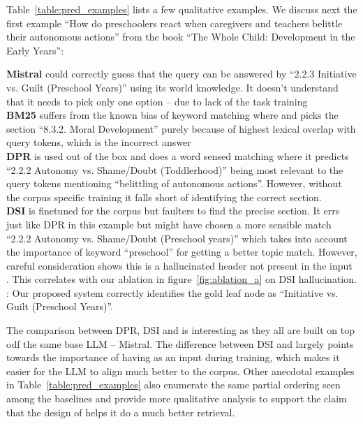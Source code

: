 Table~\ref{table:pred_examples} lists a few qualitative examples. We discuss next the first example ``How do preschoolers react when caregivers and teachers belittle their autonomous actions'' from the book ``The Whole Child: Development in the Early Years'':

\textbf{Mistral} could correctly guess that the query can be answered by ``2.2.3 Initiative vs. Guilt (Preschool Years)'' using its world knowledge. It doesn't understand that it needs to pick only one option -- due to lack of the task training\\
\textbf{BM25} suffers from the known bias of keyword matching where and picks the section ``8.3.2. Moral Development'' purely because of highest lexical overlap with query tokens, which is the incorrect answer\\
\textbf{DPR} is used out of the box and does a word sensed matching where it predicts ``2.2.2 Autonomy vs. Shame/Doubt (Toddlerhood)'' being most relevant to the query tokens mentioning ``belittling of autonomous actions''. However, without the corpus specific training it falls short of identifying the correct section.\\
\textbf{DSI} is finetuned for the corpus but faulters to find the precise section. It errs just like DPR in this example but might have chosen a more sensible match ``2.2.2 Autonomy vs. Shame/Doubt (Preschool years)'' which takes into account the importance of keyword ``preschool'' for getting a better topic match. However, careful consideration shows this is a hallucinated header not present in the input {\toc}. This correlates with our ablation in figure~\ref{fig:ablation_a} on DSI hallucination.\\
\textbf{\sys}: Our proposed system {\sys} correctly identifies the gold leaf node as ``Initiative vs. Guilt (Preschool Years)''. 

The comparison between DPR, DSI and {\sys} is interesting as they all are built on top odf the same base LLM -- Mistral. The difference between DSI and {\sys} largely points towards the importance of having {\toc} as an input during training, which makes it easier for the LLM to align much better to the corpus. Other anecdotal examples in Table~\ref{table:pred_examples} also enumerate the same partial ordering seen among the baselines and provide more qualitative analysis to support the claim that the design of {\sys} helps it do a much better retrieval.


